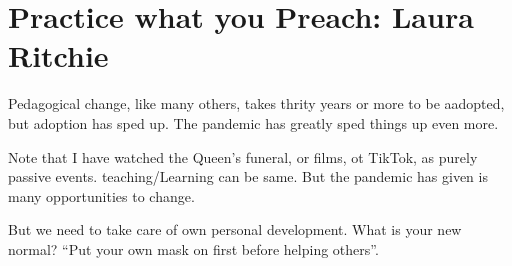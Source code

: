 \documentclass{article}
\begin{document}
\author{Notes by J.H.Davenport}
\title{}
\date{19 September 2022}
\maketitle
\def\r{$\rightarrow$}
\section{Practice what you Preach: Laura Ritchie}
Pedagogical change, like many others, takes thrity years or more to be aadopted, but adoption has sped up. The pandemic has greatly sped things up even more.
\par
Note that I have watched the Queen's funeral, or films, ot TikTok, as purely passive events. teaching/Learning can be same. But the pandemic has given is many opportunities to change.
\par
But we need to take care of own personal development. What is your new normal?  ``Put your own mask on first before helping others''.
\end{document}
